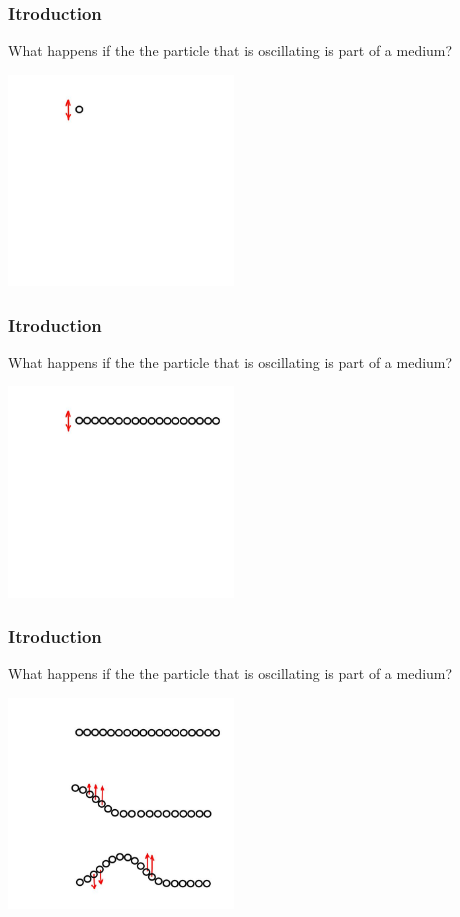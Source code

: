 \documentclass[]{beamer}
\begin{document}
\begin{frame}
\frametitle{Itroduction}

What happens if the the particle that is oscillating is part of a medium? 

\begin{center}
  \includegraphics[height=2.2in]{images4/0b.jpg}
\end{center}

  \end{frame}


\begin{frame}
\frametitle{Itroduction}

What happens if the the particle that is oscillating is part of a medium? 

\begin{center}
  \includegraphics[height=2.2in]{images4/0c.jpg}
\end{center}

  \end{frame}

\begin{frame}
\frametitle{Itroduction}

What happens if the the particle that is oscillating is part of a medium? 

\begin{center}
  \includegraphics[height=2.2in]{images4/0.jpg}
\end{center}

  \end{frame}
\end{document}

